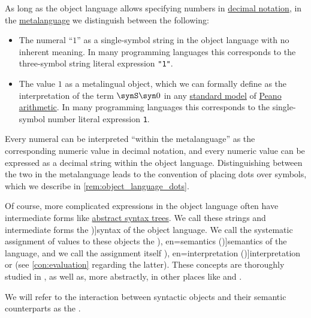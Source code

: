 \begin{concept}\label{con:syntax_semantics_duality}
  As long as the object language allows specifying numbers in \hyperref[def:positional_number_system/decimal]{decimal notation}, in the \hyperref[con:metalanguage]{metalanguage} we distinguish between the following:
  \begin{itemize}
    \item The numeral \enquote{\( 1 \)} as a single-symbol string in the object language with no inherent meaning. In many programming languages this corresponds to the three-symbol string literal expression \texttt{"1"}.

    \item The value \( 1 \) as a metalingual object, which we can formally define as the interpretation of the term \( \synS \syn0 \) in any \hyperref[def:peano_arithmetic_standard_model]{standard model} of \hyperref[def:peano_arithmetic]{Peano arithmetic}. In many programming languages this corresponds to the single-symbol number literal expression \texttt{1}.
  \end{itemize}

  Every numeral can be interpreted \enquote{within the metalanguage} as the corresponding numeric value in decimal notation, and every numeric value can be expressed as a decimal string within the object language. Distinguishing between the two in the metalanguage leads to the convention of placing dots over symbols, which we describe in \cref{rem:object_language_dots}.

  Of course, more complicated expressions in the object language often have intermediate forms like \hyperref[con:abstract_syntax_tree]{abstract syntax trees}. We call these strings and intermediate forms the \term[en=syntax (\cite[8]{Hinman2005Logic})]{syntax} of the object language. We call the systematic assignment of values to these objects the \term[ru=семантика (\cite[54]{КолмогоровДрагалин2006ЛогикаВведение}), en=semantics (\cite[8]{Hinman2005Logic})]{semantics} of the language, and we call the assignment itself \term[ru=интерпретация (сигнатуры первого порядка) (\cite[74]{ШеньВерещагин2017ЯзыкиИИсчисления}), en=interpretation (\cite[68]{VanDalen2004LogicAndStructure})]{interpretation} or  (see \cref{con:evaluation} regarding the latter). These concepts are thoroughly studied in , as well as, more abstractly, in other places like  and .

  We will refer to the interaction between syntactic objects and their semantic counterparts as the .
\end{concept}

